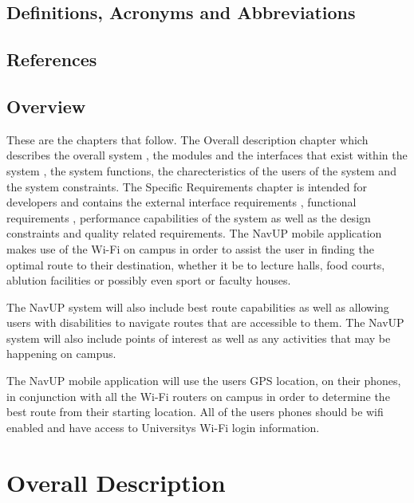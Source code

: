 \documentclass[11pt,a4paper]{report}
\begin{document}
	\section{Definitions, Acronyms and Abbreviations}
	

	\section{References}


	\section{Overview}
		These are the chapters that follow. The Overall description chapter which describes the overall system , the modules and the interfaces that exist within the system , the system functions, the charecteristics of the users of the system and the system constraints. The Specific Requirements chapter is intended for developers and contains the external interface requirements , 			functional requirements , performance capabilities of the system as well as the design constraints and quality related requirements.
		The NavUP mobile application makes use of the Wi-Fi on campus in order to assist the user in finding the optimal route to their destination, whether it be to lecture halls, food courts, ablution facilities or possibly even sport or faculty houses.
		\\
		\par
		The NavUP system will also include best route capabilities as well as allowing users with disabilities to navigate routes that are accessible to them. The NavUP system will also include points of interest as well as any activities that may be happening on campus.
		\\
		\par
		The NavUP mobile application will use the users GPS location, on their phones, in conjunction with all the Wi-Fi routers on campus in order to determine the best route from their starting location. All of the users phones should be wifi enabled and have access to Universitys Wi-Fi login information.
	
		


\newpage
\chapter{Overall Description}
\end{document}
